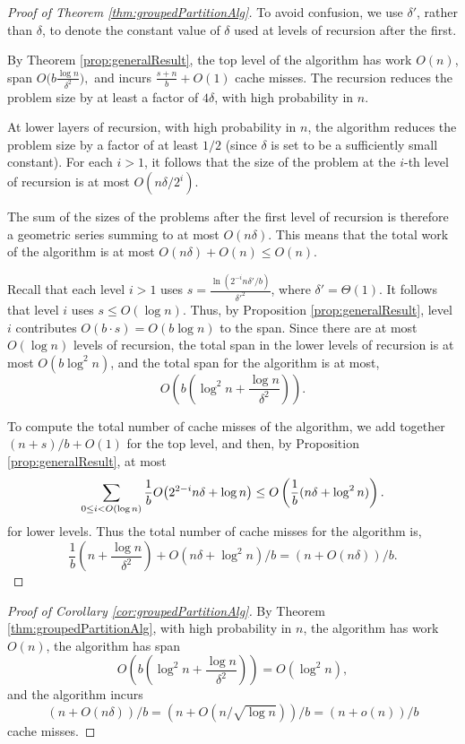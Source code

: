 \documentclass[11pt]{article}
\DeclarePairedDelimiter{\paren}{(}{)}
\theoremstyle{remark}
\theoremstyle{remark}
\begin{document}
\begin{proof}[Proof of Theorem \ref{thm:groupedPartitionAlg}]
  To avoid confusion, we use $\delta'$, rather than $\delta$, to
  denote the constant value of $\delta$ used at levels of recursion
  after the first.
  
  
  By Theorem \ref{prop:generalResult}, the top level of the algorithm
  has work $O(n)$, span $O\Big(b\frac{\log n}{\delta^2}\Big),$ and
  incurs $\frac{s+n}{b} + O(1)$ cache misses.  The recursion reduces
  the problem size by at least a factor of $4\delta$, with high
  probability in $n$.

  At lower layers of recursion, with high probability in $n$, the
  algorithm reduces the problem size by a factor of at least
  $1/2$ (since $\delta$ is set to be a sufficiently small
  constant). For each $i > 1$, it follows that the size of the problem at the $i$-th level of recursion is at most $O(n \delta / 2^i)$.
  
  The sum of the sizes of the problems after the first level of
  recursion is therefore a geometric series summing to at most $O(n
  \delta)$. This means that the total work of the algorithm is at most
  $O(n\delta) + O(n) \le O(n)$.

  Recall that each level $i > 1$ uses $s =
  \frac{\ln(2^{-i}n\delta'/b)}{\delta'^2}$, where $\delta' =
  \Theta(1)$. It follows that level $i$ uses $s \le O(\log n)$.  Thus,
  by Proposition \ref{prop:generalResult}, level $i$ contributes
  $O(b\cdot s)=O(b \log n)$ to the span.  Since there are at most  $O(\log n)$ levels of recursion, the total span in the lower levels
  of recursion is at most $O(b\log^2 n)$, and the total span for the
  algorithm is at most,
	$$O\left(b\left(\log^2 n + \frac{\log n}{\delta^2}\right)\right).$$
        
	To compute the total number of cache misses of the algorithm,
        we add together $(n+s)/b+O(1)$ for the top level, and then, by
        Proposition \ref{prop:generalResult}, at most
	$$\sum_{0 \leq i< O(\log n)}\frac{1}{b} O\paren*{2^{2-i}n\delta + \log n} \le O\left(\frac{1}{b} (n \delta + \log^2 n)\right).$$
	for lower levels.
	Thus the total number of cache misses for the algorithm is, 
	$$\frac{1}{b}\left(n+\frac{\log n}{\delta^2 }\right) + O(n\delta + \log^2 n) / b = (n+O(n\delta))/b.$$
\end{proof}

\begin{proof}[Proof of Corollary \ref{cor:groupedPartitionAlg}] By Theorem \ref{thm:groupedPartitionAlg}, with high probability in $n$, the algorithm has work $O(n)$, the algorithm has span
	$$O\left(b\left(\log^2 n + \frac{\log
    n}{\delta^2}\right)\right) = O(\log^2 n),$$ and the algorithm
  incurs
	$$(n+O(n\delta))/b = (n+O(n/\sqrt{\log n}))/b = (n+o(n))/b$$ 
	cache misses.
\end{proof}
\end{document}
